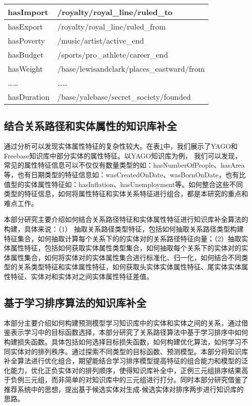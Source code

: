 \begin{table}[htbp]
\begin{tabular}{|l|l|}
    hasImport  & /royalty/royal\_line/ruled\_to \\
    \hline
    hasExport  & /royalty/royal\_line/ruled\_from \\
    \hline
    hasPoverty  & /music/artist/active\_end \\
    \hline
    hasBudget  & /sports/pro\_athlete/career\_end \\
    \hline
    hasWeight  & /base/lewisandclark/places\_eastward/from \\
    \hline
    ……  & ……\\
    \hline
    hasDuration  & /base/yalebase/secret\_society/founded \\
    \hline
    \end{tabular}%
  \label{tab:addlabel-attr}%
\end{table}%

\subsection{结合关系路径和实体属性的知识库补全}
通过分析可以发现实体属性特征的复杂性较大。在表\ref{tab:addlabel-attr}中，我们展示了YAGO和Freebase知识库中部分实体的属性特征。以YAGO知识库为例，
我们可以发现，常见的属性特征信息可以不仅仅有数量类型的如：hasNumberOfPeople、hasArea等，也有日期类型的特征信息如：wasCreatedOnDate、wasBornOnDate，也有比值型的实体属性特征如：hasInflation、hasUnemployment等。如何整合这些不同类型的特征信息，如何将属性特征和实体关系特征进行组合，都是本研究的重点和难点工作。

本部分研究主要介绍如何结合关系路径特征和实体属性特征进行知识库补全算法的构建，具体来说：（1）
抽取关系路径类型特征，包括如何抽取关系路径类型构建特征集合，如何抽取计算每个关系下的的实体对的关系路径特征向量；（2）抽取实体属性特征，包括如何获取实体属性类型集合，如何抽取每个关系下的实体对的实体属性集合，如何将实体对的实体属性集合进行标准化、归一化，如何结合不同类型的关系类型特征和实体属性特征，如何获取头实体实体属性特征、尾实体实体属性特征、实体对和实体对之间实体属性特征差值。

\subsection{基于学习排序算法的知识库补全}
本部分主要介绍如何构建预测模型学习知识库中的实体和实体之间的关系，通过借鉴表示学习中的目标函数选择，本部分研究了关系路径算法中基于学习排序中如何构建损失函数。具体包括如何选择目标损失函数，如何构建优化算法，如何学习不同实体对的排列秩序。通过探索不同类型的目标函数、预测模型。本部分将知识库补全算法进行优化组合，期望能结合学习排序模型提高特征的组合能力和模型的泛化能力，优化正负实体对的排列顺序，使得知识库补全中，正例三元组排序结果高于负例三元组，而非简单的对知识库中的三元组进行打分。同时本部分研究借鉴了推荐系统中的思想，提出基于候选实体对生成-候选实体对排序两步进行知识库的思路。

